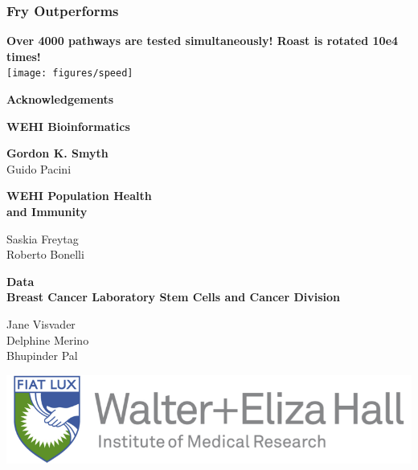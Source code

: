\documentclass[9pt,t]{beamer}
\begin{document}
\begin{frame}
\frametitle{Fry Outperforms}
\vfill
\large\textbf{\color{oxygenpurple}Over 4000 pathways are tested simultaneously! Roast is rotated 10e4 times!}\\
\vfill
\texttt{[image: figures/speed]}
\end{frame}

\begin{frame}[plain,t]
	\vspace{0.7cm}
	\textbf{\huge{Acknowledgements}}\\
	\vspace{1cm}
	
	\begin{minipage}[t]{0.49\textwidth}
	{\color{oxygenpurple}\textbf{WEHI Bioinformatics}}\\
	\vspace{0.20cm}
	
	\textbf{Gordon K. Smyth}\\
	Guido Pacini\\
	\vspace{0.35cm}
	
	{\color{oxygenpurple}\textbf{WEHI Population Health \\and Immunity}}\\
	\vspace{0.20cm}
	
	Saskia Freytag\\
	Roberto Bonelli\\
	\vspace{0.7cm}
	\end{minipage}%
	\begin{minipage}[t]{0.49\textwidth}
	{\color{oxygenpurple}\textbf{Data}}\\	
	{\color{oxygenrose}\textbf{Breast Cancer Laboratory Stem Cells and Cancer Division}}\\
	\vspace{0.20cm}
	
	Jane Visvader\\
	Delphine Merino\\
	Bhupinder Pal
	\vspace{0.75cm}
	
	\includegraphics[width=1\textwidth]{WEHI}
	\vspace{1.35cm}
	
	
	\end{minipage}
	
\end{frame}
\end{document}
